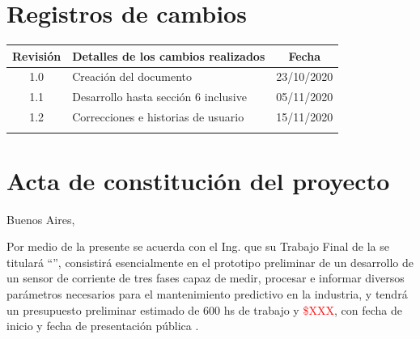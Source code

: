 \documentclass[11pt]{charter}
\begin{document}
\maketitle
\thispagestyle{empty}
\pagebreak


\thispagestyle{empty}
{\setlength{\parskip}{0pt}
\tableofcontents{}
}
\pagebreak


\section{Registros de cambios}
\label{sec:registro}


\begin{table}[ht]
\label{tab:registro}
\centering
\begin{tabularx}{\linewidth}{@{}|c|X|c|@{}}
\hline
\rowcolor[HTML]{C0C0C0} 
Revisión & \multicolumn{1}{c|}{\cellcolor[HTML]{C0C0C0}Detalles de los cambios realizados} & Fecha      \\ \hline
1.0      & Creación del documento                                          & 23/10/2020 \\ \hline
1.1      & Desarrollo hasta sección 6 inclusive                            & 05/11/2020 \\ \hline
1.2      & Correcciones e historias de usuario                            & 15/11/2020 \\ \hline
      &                                                   &  \\ \hline
\end{tabularx}
\end{table}

\pagebreak



\section{Acta de constitución del proyecto}
\label{sec:acta}

\begin{flushright}
Buenos Aires, \fechaInicioName
\end{flushright}

\vspace{2cm}

Por medio de la presente se acuerda con el Ing. \authorname\hspace{1px} que su Trabajo Final de la \degreename\hspace{1px} se titulará ``\ttitle'', consistirá esencialmente en el prototipo preliminar de un desarrollo de un sensor de corriente de tres fases capaz de medir, procesar e informar diversos parámetros necesarios para el mantenimiento predictivo en la industria, y tendrá un presupuesto preliminar estimado de 600 hs de trabajo y \textcolor{red}{\$XXX}, con fecha de inicio \fechaInicioName\hspace{1px} y fecha de presentación pública \fechaFinalName.
\end{document}
